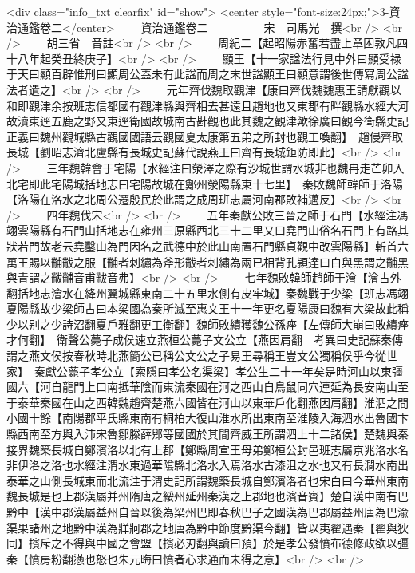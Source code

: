 <div class="info_txt clearfix" id="show">
<center style="font-size:24px;">3-資治通鑑卷二</center>
  　　資治通鑑卷二　　　　　宋　司馬光　撰<br />
<br />
　　胡三省　音註<br />
<br />
　　周紀二【起昭陽赤奮若盡上章困敦凡四十八年起癸丑終庚子】<br />
<br />
　　顯王【十一家諡法行見中外曰顯受禄于天曰顯百辟惟刑曰顯周公蓋未有此諡而周之末世諡顯王曰顯意謂後世傳寫周公諡法者遺之】<br />
<br />
　　元年齊伐魏取觀津【康曰齊伐魏魏惠王請獻觀以和即觀津余按班志信都國有觀津縣與齊相去甚遠且趙地也又東郡有畔觀縣水經大河故瀆東逕五鹿之野又東逕衛國故城南古卙觀也此其魏之觀津歟徐廣曰觀今衛縣史記正義曰魏州觀城縣古觀國國語云觀國夏太康第五弟之所封也觀工喚翻】　趙侵齊取長城【劉昭志濟北盧縣有長城史記蘇代說燕王曰齊有長城鉅防即此】<br />
<br />
　　三年魏韓會于宅陽【水經注曰滎澤之際有沙城世謂水城非也魏冉走芒卯入北宅即此宅陽城括地志曰宅陽故城在鄭州滎陽縣東十七里】　秦敗魏師韓師于洛陽【洛陽在洛水之北周公遷殷民於此謂之成周班志屬河南郡敗補邁反】<br />
<br />
　　四年魏伐宋<br />
<br />
　　五年秦獻公敗三晉之師于石門【水經注馮翊雲陽縣有石門山括地志在雍州三原縣西北三十二里又曰堯門山俗名石門上有路其狀若門故老云堯鑿山為門因名之武德中於此山南置石門縣貞觀中改雲陽縣】斬首六萬王賜以黼黻之服【黼者刺繡為斧形黻者刺繡為兩已相背孔頴達曰白與黑謂之黼黑與青謂之黻黼音甫黻音弗】<br />
<br />
　　七年魏敗韓師趙師于澮【澮古外翻括地志澮水在絳州翼城縣東南二十五里水側有皮牢城】秦魏戰于少梁【班志馮翊夏陽縣故少梁師古曰本梁國為秦所滅至惠文王十一年更名夏陽康曰魏有大梁故此稱少以别之少詩沼翻夏戶雅翻更工衡翻】魏師敗績獲魏公孫痤【左傳師大崩曰敗績痤才何翻】　衛聲公薨子成侯速立燕桓公薨子文公立【燕因肩翻　考異曰史記蘇秦傳謂之燕文侯按春秋時北燕簡公已稱公文公之子易王尋稱王豈文公獨稱侯乎今從世家】　秦獻公薨子孝公立【索隱曰孝公名渠梁】孝公生二十一年矣是時河山以東彊國六【河自龍門上口南抵華陰而東流秦國在河之西山自鳥鼠同穴連延為長安南山至于泰華秦國在山之西韓魏趙齊楚燕六國皆在河山以東華戶化翻燕因肩翻】淮泗之間小國十餘【南陽郡平氏縣東南有桐柏大復山淮水所出東南至淮陵入海泗水出魯國卞縣西南至方與入沛宋魯鄒滕薛郳等國國於其間齊威王所謂泗上十二諸侯】楚魏與秦接界魏築長城自鄭濱洛以北有上郡【鄭縣周宣王母弟鄭桓公封邑班志屬京兆洛水名非伊洛之洛也水經注渭水東過華隂縣北洛水入焉洛水古漆沮之水也又有長澗水南出泰華之山側長城東而北流注于渭史記所謂魏築長城自鄭濱洛者也宋白曰今華州東南魏長城是也上郡漢屬并州隋唐之綏州延州秦漢之上郡地也濱音賓】楚自漢中南有巴黔中【漢中郡漢屬益州自晉以後為梁州巴即春秋巴子之國漢為巴郡屬益州唐為巴渝渠果諸州之地黔中漢為牂牁郡之地唐為黔中節度黔渠今翻】皆以夷翟遇秦【翟與狄同】擯斥之不得與中國之會盟【擯必刃翻與讀曰預】於是孝公發憤布德修政欲以彊秦【憤房粉翻懣也怒也朱元晦曰憤者心求通而未得之意】<br />
<br />
